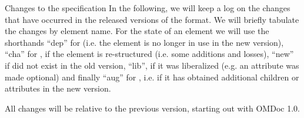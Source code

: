 \begin{tchapter}[id=changelog]{Changes to the specification}
In the following, we will keep a log on the changes that have occurred in the
released versions of the {\omdoc} format.  We will briefly tabulate the changes by
element name. For the state of an element we will use the shorthands ``dep'' for
{} (i.e. the element is no longer in use in the new {\omdoc}
version), ``cha'' for {}, if the element is re-structured (i.e.
some additions and losses), ``new'' if did not exist in the old {\omdoc} version,
``lib'', if it was liberalized (e.g. an attribute was made optional) and finally
``aug'' for {}, i.e. if it has obtained additional children or
attributes in the new {\omdoc} version.

All changes will be relative to the previous version, starting out with OMDoc 1.0.




\end{tchapter}


